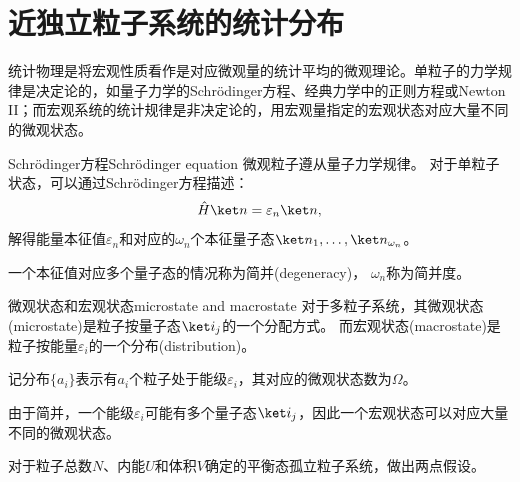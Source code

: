 \newcommand{\Om}[1][]{\Omega_{\mathrm{#1}}}

\chapter{近独立粒子系统的统计分布}

统计物理是将宏观性质看作是对应微观量的统计平均的微观理论。单粒子的力学规律是决定论的，如量子力学的Schrödinger方程、经典力学中的正则方程或Newton II；而宏观系统的统计规律是非决定论的，用宏观量指定的宏观状态对应大量不同的微观状态。


\begin{theorem}
	{Schrödinger方程}{Schrödinger equation}
	微观粒子遵从量子力学规律。
	对于单粒子状态，可以通过Schrödinger方程描述：
	\begin{equation}
		\hat H\ket n=\varepsilon_n\ket n,
	\end{equation}
	解得能量本征值$\varepsilon_n$和对应的$\omega_n$个本征量子态$\ket n_1,\ldots,\ket n_{\omega_n}$。

	一个本征值对应多个量子态的情况称为简并(degeneracy)，
	$\omega_n$称为简并度。
\end{theorem}


\begin{definition}
	{微观状态和宏观状态}{microstate and macrostate}
	对于多粒子系统，其微观状态(microstate)是粒子按量子态$\ket i_j$的一个分配方式。
	而宏观状态(macrostate)是粒子按能量$\varepsilon_i$的一个分布(distribution)。

	记分布$\{a_i\}$表示有$a_i$个粒子处于能级$\varepsilon_i$，其对应的微观状态数为$\Omega$。
\end{definition}

\begin{corollary}
	由于简并，一个能级$\varepsilon_i$可能有多个量子态$\ket i_j$，因此一个宏观状态可以对应大量不同的微观状态。
\end{corollary}

对于粒子总数$N$、内能$U$和体积$V$确定的平衡态孤立粒子系统，做出两点假设。

